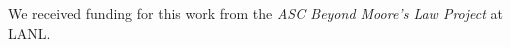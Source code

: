 \documentclass[preprint,12pt,eqsecnum,nofootinbib,amsmath,amssymb]{revtex4}
\newcommand{\bibskip}{\baselineskip16pt plus 1pt minus 1pt}
\begin{document}



%
\pagebreak
\begin{acknowledgments}
We received funding for this work from the {\em ASC Beyond Moore’s Law Project} 
at LANL.  
\end{acknowledgments}






\end{document}
